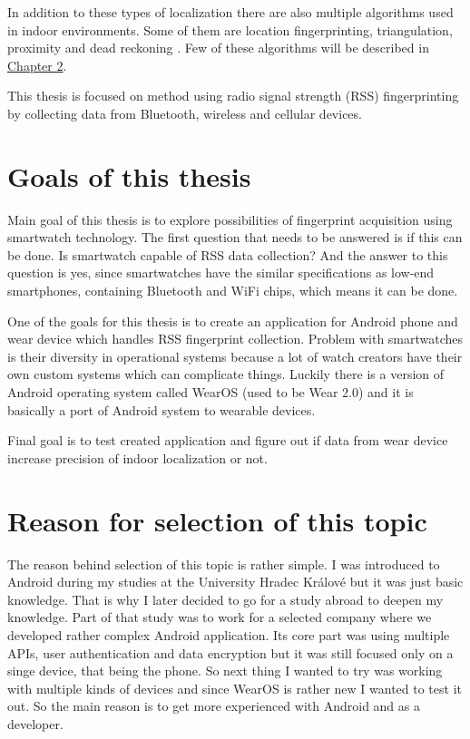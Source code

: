 In addition to these types of localization there are also multiple algorithms used in indoor environments. Some of them are location fingerprinting, triangulation, proximity and dead reckoning \cite{AaPLocalisation}. Few of these algorithms will be described in \hyperref[sec:LocalizationTechniques]{Chapter 2}.

This thesis is focused on method using radio signal strength (RSS) fingerprinting by collecting data from Bluetooth, wireless and cellular devices.

\section{Goals of this thesis}\label{sec:GoalsOfThisThesis}
Main goal of this thesis is to explore possibilities of fingerprint acquisition using smartwatch technology. The first question that needs to be answered is if this can be done. Is smartwatch capable of RSS data collection? And the answer to this question is yes, since smartwatches have the similar specifications as low-end smartphones, containing Bluetooth and WiFi chips, which means it can be done. 

One of the goals for this thesis is to create an application for Android phone and wear device which handles RSS fingerprint collection. Problem with smartwatches is their diversity in operational systems because a lot of watch creators have their own custom systems which can complicate things. Luckily there is a version of Android operating system called WearOS (used to be Wear 2.0) and it is basically a port of Android system to wearable devices. 

Final goal is to test created application and figure out if data from wear device increase precision of indoor localization or not.

\section{Reason for selection of this topic}\label{sec:ReasonForSelectionOfThisTopic}
The reason behind selection of this topic is rather simple. I was introduced to Android during my studies at the University Hradec Králové but it was just basic knowledge. That is why I later decided to go for a study abroad to deepen my knowledge. Part of that study was to work for a selected company where we developed rather complex Android application. Its core part was using multiple APIs, user authentication and data encryption but it was still focused only on a singe device, that being the phone. So next thing I wanted to try was working with multiple kinds of devices and since WearOS is rather new I wanted to test it out. So the main reason is to get more experienced with Android and as a developer.